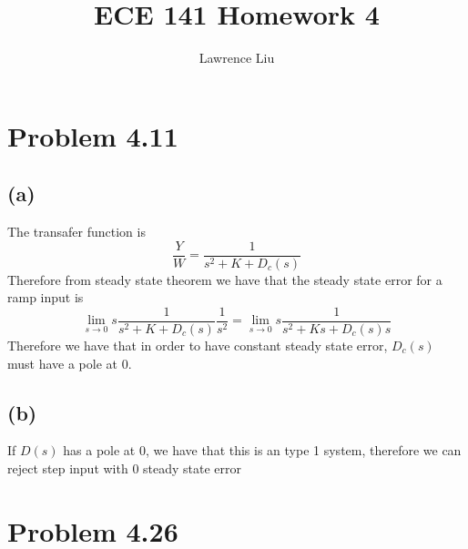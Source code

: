 \documentclass[12pt]{article}
\title{ECE 141 Homework 4}
\author{Lawrence Liu}
\begin{document}
\maketitle
\section*{Problem 4.11}
\subsection*{(a)}
The transafer function is 
$$\frac{Y}{W}=\frac{1}{s^2+K+D_c(s)}$$
Therefore from steady state theorem we have that the steady state error for a ramp input is
$$\lim_{s\to 0}s\frac{1}{s^2+K+D_c(s)}\frac{1}{s^2}=\lim_{s\to 0}s\frac{1}{s^2+Ks+D_c(s)s}$$
Therefore we have that in order to have constant steady state error, $D_c(s)$ must have
a pole at $0$.
\subsection*{(b)}
If $D(s)$ has a pole at 0, we have that this is an type 1 system, therefore we can 
reject step input with 0 steady state error
\section*{Problem 4.26}
\end{document}
